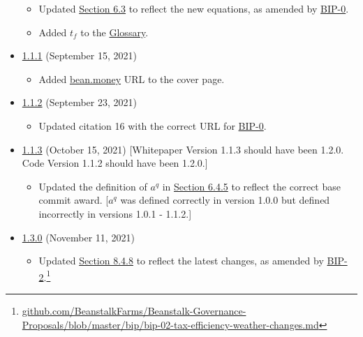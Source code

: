 \documentclass[class=article, crop=false]{standalone}
\begin{document}
\begin{itemize}[topsep=0pt, itemsep=3pt,leftmargin=16pt]
\begin{itemize}
        \item Updated \hyperlink{subsection.6.3}{Section 6.3} to reflect the new  equations, as amended by \href{https://github.com/BeanstalkFarms/Beanstalk-Governance-Proposals/blob/master/bip/bip-00-silo-refactor.md}{BIP-0}.
        \item Added $t_f$ to the \hyperlink{subsection.14.11}{Glossary}.
    \end{itemize}
    \item \href{https://github.com/BeanstalkFarms/Beanstalk/blob/master/version-history/beanstalk1_1_1.pdf}{1.1.1} (September 15, 2021)
    \begin{itemize}
        \item Added \href{https://bean.money/}{bean.money} URL to the cover page.
    \end{itemize}
    \item \href{https://github.com/BeanstalkFarms/Beanstalk/blob/master/version-history/beanstalk1_1_2.pdf}{1.1.2} (September 23, 2021)
    \begin{itemize}
        \item Updated citation 16 with the correct URL for \href{https://github.com/BeanstalkFarms/Beanstalk-Governance-Proposals/blob/master/bip/bip-00-silo-refactor.md}{BIP-0}.
    \end{itemize}
    \item \href{https://github.com/BeanstalkFarms/Beanstalk/blob/master/version-history/beanstalk1_1_3.pdf}{1.1.3} (October 15, 2021) [Whitepaper Version 1.1.3 should have been 1.2.0. Code Version 1.1.2 should have been 1.2.0.]
    \begin{itemize}
        \item Updated the definition of $a^q$ in \hyperlink{subsubsection.6.4.5}{Section 6.4.5} to reflect the correct base commit award. [$a^q$ was defined correctly in version 1.0.0 but defined incorrectly in versions 1.0.1 - 1.1.2.]
    \end{itemize}
    \item \href{https://github.com/BeanstalkFarms/Beanstalk/blob/master/version-history/beanstalk1_3_0.pdf}{1.3.0} (November 11, 2021)
    \begin{itemize}
        \item Updated \hyperlink{subsubsection.8.4.8}{Section 8.4.8} to reflect the latest  changes, as amended by \href{https://github.com/BeanstalkFarms/Beanstalk-Governance-Proposals/blob/master/bip/bip-02-tax-efficiency-weather-changes.md}{BIP-2}.\footnote{\href{https://github.com/BeanstalkFarms/Beanstalk-Governance-Proposals/blob/master/bip/bip-02-tax-efficiency-weather-changes.md}{github.com/BeanstalkFarms/Beanstalk-Governance-Proposals/blob/master/bip/bip-02-tax-efficiency-weather-changes.md}}

\end{itemize}
\end{itemize}
\end{document}
